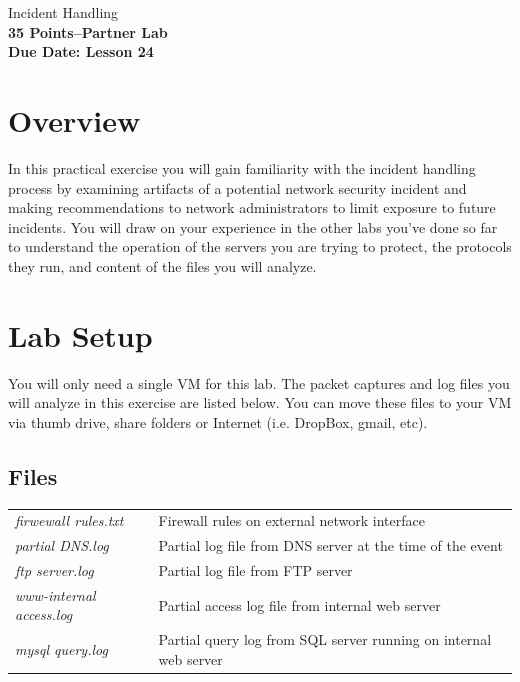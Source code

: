 \documentclass{article}
\begin{document}
\begin{center}
{\LARGE Incident Handling}\\
\textbf{35 Points--Partner Lab}\\
\textbf{Due Date: Lesson 24}\\
\end{center}

\copyrightnoticeA

\setcounter{task}{1}
\newcommand{\mytask} {{\arabic{task}}\addtocounter{task}{1}}

\section{Overview}
In this practical exercise you will gain familiarity with the incident handling process by examining artifacts of a potential network security incident and making recommendations to network administrators to limit exposure to future incidents. You will draw on your experience in the other labs you've done so far to understand the operation of the servers you are trying to protect, the protocols they run, and content of the files you will analyze.

\section{Lab Setup}
You will only need a single VM for this lab. The packet captures and log files you will analyze in this exercise are listed below. You can move these files to your VM via thumb drive, share folders or Internet (i.e. DropBox, gmail, etc).

\subsection{Files}

\begin{table}[ht]
\centering
\label{my-label}
\begin{tabular}{ll}
\textit{firwewall rules.txt} 		& Firewall rules on external network interface\\
\textit{partial DNS.log}			& Partial log file from DNS server at the time of the event\\
\textit{ftp server.log}		& Partial log file from FTP server\\
\textit{www-internal access.log}	& Partial access log file from internal web server\\
\textit{mysql query.log}			& Partial query log from SQL server running on internal web server
\end{tabular}
\end{table}
\end{document}
